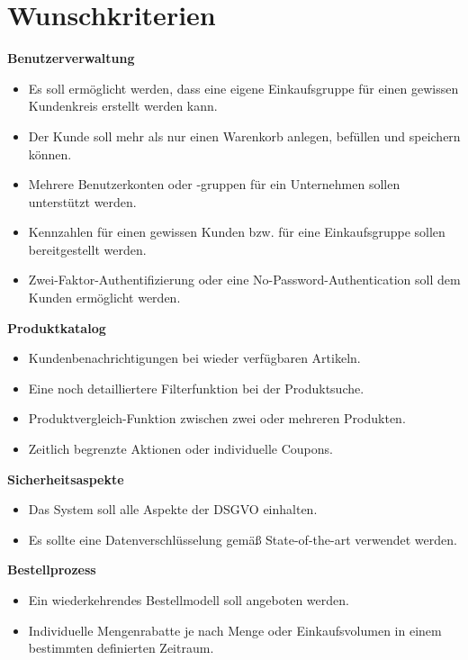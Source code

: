 \documentclass[%
	ngerman,
	12pt,
	a4paper,
	oneside,
	parskip=full
]{scrbook}
\begin{document}
\section{Wunschkriterien}
	\vspace{0.5cm}
	\textbf{Benutzerverwaltung}
	\begin{itemize}
		\item Es soll ermöglicht werden, dass eine eigene Einkaufsgruppe für einen gewissen Kundenkreis erstellt werden kann.
		\item Der Kunde soll mehr als nur einen Warenkorb anlegen, befüllen und speichern können.
		\item Mehrere Benutzerkonten oder -gruppen für ein Unternehmen sollen unterstützt werden.
		\item Kennzahlen für einen gewissen Kunden bzw. für eine Einkaufsgruppe sollen bereitgestellt werden.
		\item Zwei-Faktor-Authentifizierung oder eine No-Password-Authentication soll dem Kunden ermöglicht werden.
	\end{itemize}

	\vspace{0.5cm}
	\textbf{Produktkatalog}
	\begin{itemize}
		\item Kundenbenachrichtigungen bei wieder verfügbaren Artikeln.
		\item Eine noch detailliertere Filterfunktion bei der Produktsuche.
		\item Produktvergleich-Funktion zwischen zwei oder mehreren Produkten.
		\item Zeitlich begrenzte Aktionen oder individuelle Coupons.
	\end{itemize}

	\vspace{0.5cm}
	\textbf{Sicherheitsaspekte}
	\begin{itemize}
		\item Das System soll alle Aspekte der DSGVO einhalten.
		\item Es sollte eine Datenverschlüsselung gemäß State-of-the-art verwendet werden.
	\end{itemize}

	\vspace{0.5cm}
	\textbf{Bestellprozess}
	\begin{itemize}
		\item Ein wiederkehrendes Bestellmodell soll angeboten werden.
		\item Individuelle Mengenrabatte je nach Menge oder Einkaufsvolumen in einem bestimmten definierten Zeitraum.
	\end{itemize}
\end{document}
